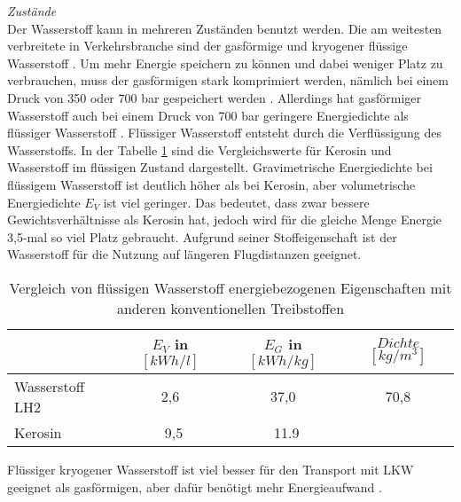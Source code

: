 %
\textit{Zustände}\\
Der Wasserstoff kann in mehreren Zuständen benutzt werden. Die am weitesten verbreitete in
Verkehrsbranche sind der gasförmige  und kryogener flüssige Wasserstoff . 
Um mehr Energie speichern zu können und dabei weniger Platz zu verbrauchen, muss der gasförmigen  stark komprimiert werden, 
nämlich bei einem Druck von 350 oder 700 bar gespeichert werden \cite{colpan2022fuel}.
Allerdings hat gasförmiger Wasserstoff auch bei einem Druck von 700 bar geringere Energiedichte
als flüssiger Wasserstoff \cite{eichlseder2012hydrogen}.
Flüssiger Wasserstoff entsteht durch die Verflüssigung des Wasserstoffs.
In der Tabelle \ref{wasserstoff_energie} sind die Vergleichswerte für Kerosin und Wasserstoff im flüssigen Zustand dargestellt.
Gravimetrische Energiedichte bei flüssigem Wasserstoff ist deutlich höher als bei Kerosin, aber volumetrische Energiedichte $E_V$ ist viel geringer.
Das bedeutet, dass  zwar bessere Gewichtsverhältnisse als Kerosin hat, jedoch wird für die gleiche Menge Energie 3,5-mal so viel Platz gebraucht.
Aufgrund seiner Stoffeigenschaft ist der Wasserstoff für die Nutzung auf längeren Flugdistanzen geeignet.
\begin{table}[h]
	\begin{center}
    \caption{Vergleich von flüssigen Wasserstoff energiebezogenen Eigenschaften mit anderen konventionellen Treibstoffen }
	\label{wasserstoff_energie}
	\begin{tabular}{|l|c|c|c|}
		\hline
		& \textbf{$E_V$ in $[kWh/l]$} & \textbf{$E_G$ in $[kWh/kg]$} & \textbf{$Dichte$ $[kg/m^3]$}  \\ \hline
		Wasserstoff LH2 & 2,6 \cite{colpan2022fuel} & 37,0 \cite{colpan2022fuel} & 70,8 \cite{eichlseder2012hydrogen}\\ \hline
		Kerosin & ~9,5 \cite{colpan2022fuel} & ~11.9 \cite{colpan2022fuel}&  \\ \hline
	\end{tabular}
    \end{center}
\end{table}
%
Flüssiger kryogener Wasserstoff ist viel besser für den Transport mit LKW geeignet als gasförmigen,
aber dafür benötigt mehr Energieaufwand \cite{colpan2022fuel}. 

